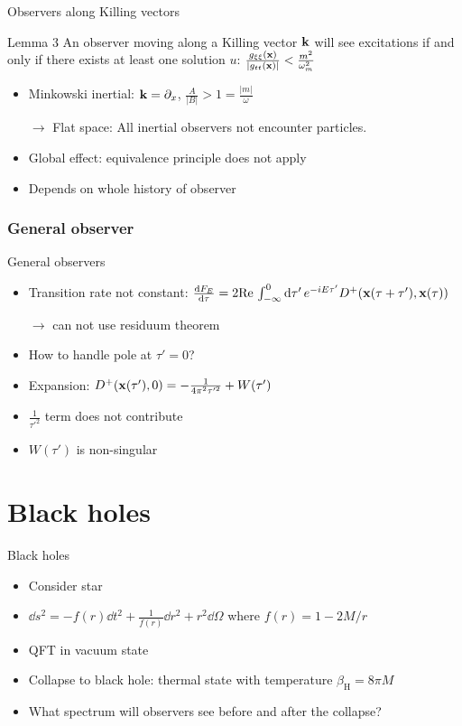 \documentclass{beamer}
\newcommand{\ind}[1]{_\mathrm{#1}}
\begin{document}
\begin{frame}{Observers along Killing vectors}
\begin{block}{Lemma 3}
An observer moving along a Killing vector \(\vb{k}\) will see excitations if and only if there exists at least one solution \(u\): \(\frac{g_{\xi\xi}(\vb{x})}{|g_{tt}(\vb{x})|} < \frac{m^2}{\omega_m^2}\)
\end{block} 
\begin{itemize}
	\item Minkowski inertial: \(\vb{k} = \partial_x\), \(\frac{A}{|B|} > 1 = \frac{|m|}{\omega}\) 
	\item[\(\to\)] Flat space: All inertial observers not encounter particles.
	\item[]
	\item Global effect: equivalence principle does not apply
	\item Depends on whole history of observer 
\end{itemize}
\end{frame}


\subsubsection{General observer}
\begin{frame}{General observers}
\begin{itemize}
	\item Transition rate not constant: \(\dv{F_E}{\tau} = 2 \mathrm{Re}\,\int_{-\infty}^0 \dd{\tau'} e^{-i E \tau'} D^+(\vb{x}(\tau + \tau'), \vb{x}(\tau))\)
	\item[]\(\to\) can not use residuum theorem
	\item How to handle pole at \(\tau' = 0\)?
	\item[]
	\item Expansion: \(D^+(\vb{x}(\tau'), 0) = - \frac{1}{4\pi^2\tau'^2} + W(\tau')\)
	\item \(\frac{1}{\tau'^2}\) term does not contribute
	\item \(W(\tau')\) is non-singular
\end{itemize}
\end{frame}

\section{Black holes}
\begin{frame}{Black holes}
\begin{itemize}
	\item Consider star
	\item \(\dd s^2 = -f(r)\dd{t^2} + \frac{1}{f(r)}\dd{r^2} + r^2 \dd{\Omega}\) where \(f(r) = 1 - 2M/r\)
	\item QFT in vacuum state
	\item Collapse to black hole: thermal state with temperature \(\beta\ind{H} = 8\pi M\)
	\item What spectrum will observers see before and after the collapse?
\end{itemize}
\end{frame}
\end{document}
